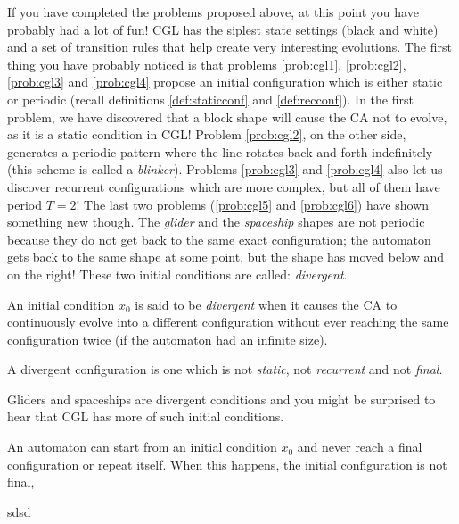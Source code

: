 If you have completed the problems proposed above, at this point you have probably had
a lot of fun! CGL has the siplest state settings (black and white) and a set of
transition rules that help create very interesting evolutions. The first thing you have probably
noticed is that problems \ref{prob:cgl1}, \ref{prob:cgl2}, \ref{prob:cgl3} and \ref{prob:cgl4}
propose an initial configuration which is either static or periodic (recall definitions
\ref{def:staticconf} and \ref{def:recconf}). 
In the first problem, we have discovered that a block shape will cause the CA not to evolve,
as it is a static condition in CGL!
Problem \ref{prob:cgl2}, on the other side, generates a periodic pattern where the line rotates
back and forth indefinitely (this scheme is called a \textit{blinker}). Problems
\ref{prob:cgl3} and \ref{prob:cgl4} also let us discover recurrent configurations which are more
complex, but all of them have period $T=2$!
The last two problems (\ref{prob:cgl5} and \ref{prob:cgl6}) have shown something new though. The
\textit{glider} and the \textit{spaceship} shapes are not periodic because they do not get back
to the same exact configuration; the automaton gets back to the same shape at some point,
but the shape has moved below and on the right!
These two initial conditions are called: \textit{divergent}.

\begin{definition}
\label{def:divconf}
An initial condition $x_0$ is said to be
\textit{divergent} when it causes the CA to continuously evolve
into a different configuration without ever reaching the same configuration twice
(if the automaton had an infinite size).
\end{definition}

\begin{proposition}
A divergent configuration is one which is not \textit{static}, not \textit{recurrent} and not
\textit{final}.
\end{proposition}

Gliders and spaceships are divergent conditions and you might be surprised to hear that
CGL has more of such initial conditions.

\begin{proposition}
An automaton can start from an initial condition $x_0$ and never reach a final configuration or
repeat itself. When this happens, the initial configuration is not final, 
\end{proposition}

sdsd

